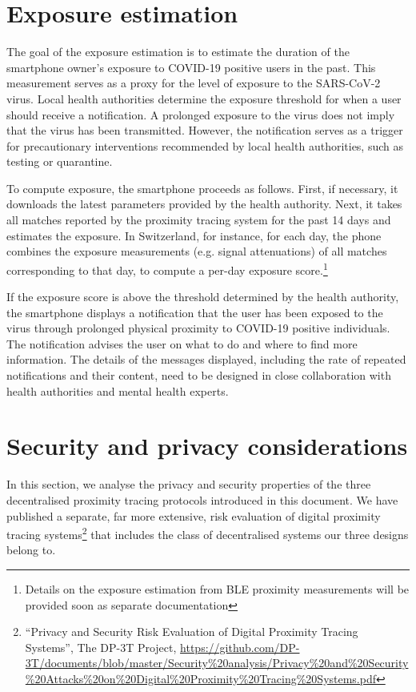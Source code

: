 \documentclass{article}
\begin{document}
\section{Exposure estimation}\label{exposure-estimation}

The goal of the exposure estimation is to estimate the duration of the
smartphone owner's exposure to COVID-19 positive users in the past. This
measurement serves as a proxy for the level of exposure to the
SARS-CoV-2 virus. Local health authorities determine the exposure
threshold for when a user should receive a notification. A prolonged
exposure to the virus does not imply that the virus has been
transmitted. However, the notification serves as a trigger for
precautionary interventions recommended by local health authorities,
such as testing or quarantine.

To compute exposure, the smartphone proceeds as follows. First, if
necessary, it downloads the latest parameters provided by the health
authority. Next, it takes all matches reported by the proximity tracing
system for the past 14 days and estimates the exposure. In Switzerland,
for instance, for each day, the phone combines the exposure measurements
(e.g. signal attenuations) of all matches corresponding to that day, to
compute a per-day exposure score.\footnote{Details on the exposure
  estimation from BLE proximity measurements will be provided soon as
  separate documentation}

If the exposure score is above the threshold determined by the health
authority, the smartphone displays a notification that the user has been
exposed to the virus through prolonged physical proximity to COVID-19
positive individuals. The notification advises the user on what to do
and where to find more information. The details of the messages
displayed, including the rate of repeated notifications and their
content, need to be designed in close collaboration with health
authorities and mental health experts.


\section{Security and privacy considerations}\label{security-and-privacy-considerations}

In this section, we analyse the privacy and security properties of the
three decentralised proximity tracing protocols introduced in this
document. We have published a separate, far more extensive, risk
evaluation of digital proximity tracing systems\footnote{``Privacy and
  Security Risk Evaluation of Digital Proximity Tracing Systems'', The
  DP-3T Project,
  \href{https://github.com/DP-3T/documents/blob/master/Security\%20analysis/Privacy\%20and\%20Security\%20Attacks\%20on\%20Digital\%20Proximity\%20Tracing\%20Systems.pdf}{{https://github.com/DP-3T/documents/blob/master/Security\%20analysis/Privacy\%20and\%20Security\%20Attacks\%20on\%20Digital\%20Proximity\%20Tracing\%20Systems.pdf}}}
that includes the class of decentralised systems our three designs
belong to.
\end{document}
